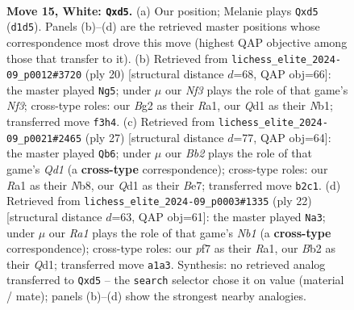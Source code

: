 \documentclass[11pt]{article}
\begin{document}
\begin{figure}[p]
\label{fig:thought-m26}
\end{figure}

\clearpage

\begin{figure}[p]\centering
\begin{subfigure}{0.46\textwidth}\centering
\resizebox{\linewidth}{!}{%
\newchessgame
\chessboard[
  setfen={2b2r1k/1p2qp1p/r1n2np1/p1bp4/P7/1P2PNP1/1B3PBP/RN1QR1K1 w - - 4 15},
  showmover=false,
  pgfstyle=straightmove, color=movearrow, markmove={d1-d5}
]}
\caption{}
\end{subfigure}\hfill
\begin{subfigure}{0.46\textwidth}\centering
\resizebox{\linewidth}{!}{%
\newchessgame
\chessboard[
  setfen={r1bq1rk1/pp2ppbp/2n3p1/2PnP3/8/5NP1/PP3PBP/RNBQ1RK1 w - - 1 11},
  showmover=false,
  pgfstyle=straightmove, color=movearrow, markmove={f3-g5}
]}
\caption{}
\end{subfigure}
\\[4pt]
\begin{subfigure}{0.46\textwidth}\centering
\resizebox{\linewidth}{!}{%
\newchessgame
\chessboard[
  setfen={rn1q1rk1/1b2bppp/p3pn2/1p6/1P6/P1NBPN2/4QPPP/R1BR2K1 b - - 3 14},
  showmover=false,
  pgfstyle=straightmove, color=movearrow, markmove={d8-b6}
]}
\caption{}
\end{subfigure}\hfill
\begin{subfigure}{0.46\textwidth}\centering
\resizebox{\linewidth}{!}{%
\newchessgame
\chessboard[
  setfen={rnbqr1k1/2pn1pbp/1p4p1/p3p3/P3P3/1P3NP1/1BP2PBP/RN1QR1K1 w - - 0 12},
  showmover=false,
  pgfstyle=straightmove, color=movearrow, markmove={b1-a3}
]}
\caption{}
\end{subfigure}
\caption{\textbf{Move 15, White: \texttt{Qxd5}.} (a) Our position; Melanie plays \texttt{Qxd5} (\texttt{d1d5}). Panels (b)--(d) are the retrieved master positions whose correspondence most drove this move (highest QAP objective among those that transfer to it). (b) Retrieved from \texttt{lichess\_elite\_2024-09\_p0012\#3720} (ply 20) [structural distance $d$=68, QAP obj=66]: the master played \texttt{Ng5}; under $\mu$ our \emph{Nf3} plays the role of that game's \emph{Nf3}; cross-type roles: our \emph{B}g2 as their \emph{R}a1, our \emph{Q}d1 as their \emph{N}b1; transferred move \texttt{f3h4}. (c) Retrieved from \texttt{lichess\_elite\_2024-09\_p0021\#2465} (ply 27) [structural distance $d$=77, QAP obj=64]: the master played \texttt{Qb6}; under $\mu$ our \emph{Bb2} plays the role of that game's \emph{Qd1} (a \textbf{cross-type} correspondence); cross-type roles: our \emph{R}a1 as their \emph{N}b8, our \emph{Q}d1 as their \emph{B}e7; transferred move \texttt{b2c1}. (d) Retrieved from \texttt{lichess\_elite\_2024-09\_p0003\#1335} (ply 22) [structural distance $d$=63, QAP obj=61]: the master played \texttt{Na3}; under $\mu$ our \emph{Ra1} plays the role of that game's \emph{Nb1} (a \textbf{cross-type} correspondence); cross-type roles: our \emph{p}f7 as their \emph{R}a1, our \emph{B}b2 as their \emph{Q}d1; transferred move \texttt{a1a3}. Synthesis: no retrieved analog transferred to \texttt{Qxd5} -- the \texttt{search} selector chose it on value (material / mate); panels (b)--(d) show the strongest nearby analogies.}

\end{figure}
\end{document}

